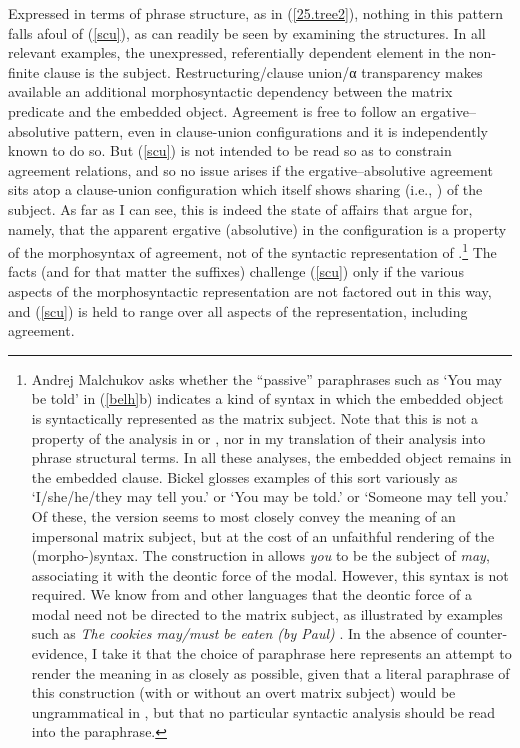 \documentclass[output=paper]{langsci/langscibook}
\begin{document}
Expressed in terms of phrase structure, as in (\ref{25.tree2}), nothing in this
pattern falls afoul of (\ref{scu}), as can readily be seen by examining the
structures. In all relevant examples, the unexpressed, referentially dependent
element in the non-finite clause is the subject. Restructuring/clause union/α
transparency makes available an additional morphosyntactic dependency between
the matrix predicate and the embedded object. Agreement is free to follow an
ergative--absolutive pattern, even in clause-union configurations and it is
independently known to do so. But (\ref{scu}) is not intended to be read so as
to constrain agreement relations, and so no issue arises if the
ergative--absolutive agreement sits atop a clause-union configuration which
itself shows sharing (i.e., ) of the subject. As far as I can see, this
is indeed the state of affairs that \cite{bicknich01} argue for, namely, that
the apparent ergative (absolutive)  in the  
configuration is a property of the morphosyntax of agreement, not of the
syntactic representation of .\footnote{Andrej Malchukov asks whether the
    ``passive'' paraphrases such as `You may be told' in (\ref{belh}b)
    indicates a kind of  syntax in which the embedded object is
    syntactically represented as the matrix subject. Note that this is not a
    property of the analysis in \citet{bicknich01} or \citet{bickel04}, nor in
    my translation of their analysis into phrase structural terms. In all these
    analyses, the embedded object remains in the embedded clause. Bickel
    glosses examples of this sort variously as `I/she/he/they may tell you.' or
    `You may be told.' or `Someone may tell you.' Of these, the  version
    seems to most closely convey the meaning of an impersonal matrix subject,
    but at the cost of an unfaithful rendering of the  (morpho-)syntax.
    The  construction in  allows \emph{you} to be the subject of
    \emph{may}, associating it with the deontic force of the modal. However,
    this syntax is not required. We know from  and other languages that
    the deontic force of a modal need not be directed to the matrix subject, as
    illustrated by examples such as \emph{The cookies may/must be eaten (by
    Paul)} \citep{warner93,wurmbrand99}. In the absence of counter-evidence, I
    take it that the choice of paraphrase here represents an attempt to render
    the meaning in  as closely as possible, given that a literal
    paraphrase of this construction (with or without an overt matrix subject)
would be ungrammatical in , but that no particular syntactic analysis
should be read into the paraphrase.} The  facts (and for that matter the
 suffixes) challenge (\ref{scu}) only if the various aspects of the
morphosyntactic representation are not factored out in this way, and
(\ref{scu}) is held to range over all aspects of the representation, including
agreement.
\end{document}
